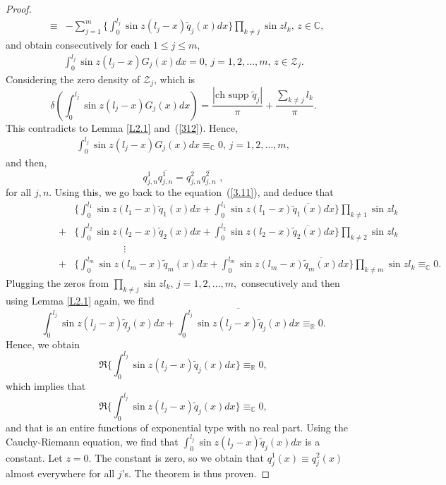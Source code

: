 \documentclass[10pt,a4paper]{article}
\theoremstyle{plain}
\theoremstyle{definition}
\theoremstyle{remark}
\numberwithin{equation}{section}
\begin{document}
\begin{proof}
\begin{eqnarray}
&\equiv&-\sum_{j=1}^{m}\Big\{\int_{0}^{l_{j}}\sin{z(l_{j}-x)}\widetilde{q}_{j}(x)dx\Big\}\prod_{k\neq j}\sin{z l_{k}},\,z\in\mathbb{C},\label{rational}
\end{eqnarray}
and obtain consecutively for each $1\leq j\leq m$,
\begin{eqnarray}\nonumber
\int_{0}^{l_{j}}\sin{z(l_{j}-x)}G_{j}(x)dx=0,\,j=1,2,\ldots,m,\,z\in\mathcal{Z}_{j}. 
\end{eqnarray}
Considering the zero density of $\mathcal{Z}_{j}$, which is  $$\delta(\int_{0}^{l_{j}}\sin{z(l_{j}-x)}G_{j}(x)dx)=\frac{|\mbox{ch supp } \widetilde{q}_{j}|}{\pi}+\frac{\sum_{k\neq j}l_{k}}{\pi}.$$ %
This contradicts to Lemma \ref{L2.1} and~(\ref{312}). Hence,
\begin{eqnarray}\nonumber
\int_{0}^{l_{j}}\sin{z(l_{j}-x)}G_{j}(x)dx\equiv_{\mathbb{C}}0,\,j=1,2,\ldots,m,
\end{eqnarray}
and then, 
$$q^{1}_{j,n}\overline{q^{1}_{j,n}}=q^{2}_{j,n}\overline{q^{2}_{j,n}}\,\,,$$ for all $j,n$. Using this, we go back to the equation~(\ref{3.11}), and deduce that
\begin{eqnarray}\nonumber
&&\{\int_{0}^{l_{1}}\sin{z(l_{1}-x)}\widetilde{q}_{1}(x)dx+\int_{0}^{l_{1}}\sin{z(l_{1}-x)}\overline{\widetilde{q}_{1}(x)}dx\}\prod_{k\neq 1}\sin{z l_{k}}\\\nonumber
&+&\{\int_{0}^{l_{2}}\sin{z(l_{2}-x)}\widetilde{q}_{2}(x)dx+\int_{0}^{l_{2}}\sin{z(l_{2}-x)}\overline{\widetilde{q}_{2}(x)}dx\}\prod_{k\neq 2}\sin{z l_{k}}\\\nonumber
&&\hspace{60pt}\vdots\\\hspace{50pt}
&+&\{\int_{0}^{l_{m}}\sin{z(l_{m}-x)}\widetilde{q}_{m}(x)dx+\int_{0}^{l_{m}}\sin{z(l_{m}-x)}\overline{\widetilde{q}_{m}(x)}dx\}\prod_{k\neq m}\sin{z l_{k}}\equiv_{\mathbb{C}}0.
\end{eqnarray}
Plugging the zeros from $\prod_{k\neq j}\sin{z l_{k}},\,j=1,2,\ldots,m,$ consecutively and then using Lemma \ref{L2.1} again, we find   %
\begin{equation}
\int_{0}^{l_{j}}\sin{z(l_{j}-x)}\widetilde{q}_{j}(x)dx+\overline{\int_{0}^{l_{j}}\sin{z(l_{j}-x)}\widetilde{q}_{j}(x)dx}\equiv_{\mathbb{R}}0.
\end{equation}
Hence, we obtain $$\Re\{\int_{0}^{l_{j}}\sin{z(l_{j}-x)}\widetilde{q}_{j}(x)dx\}\equiv_{\mathbb{R}}0,$$
which implies that 
$$\Re\{\int_{0}^{l_{j}}\sin{z(l_{j}-x)}\widetilde{q}_{j}(x)dx\}\equiv_{\mathbb{C}}0,$$ 
and that is an entire functions of exponential type with no real part. Using the Cauchy-Riemann equation, we find that $\int_{0}^{l_{j}}\sin{z(l_{j}-x)}\widetilde{q}_{j}(x)dx$ is a constant. Let $z=0$. The constant is zero, so we obtain that $q^{1}_{j}(x)\equiv q^{2}_{j}(x)$ almost everywhere for all $j$'s. The theorem is thus proven.


\end{proof}
\end{document}
